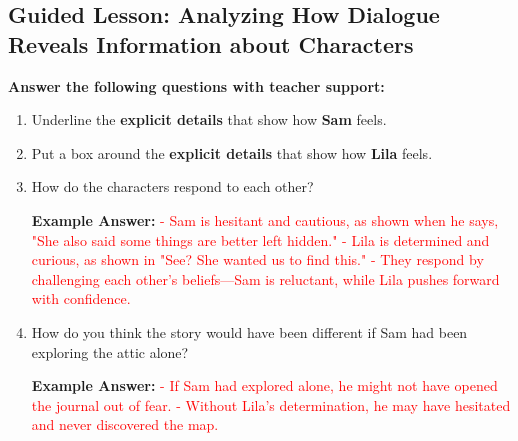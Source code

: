 \documentclass[12pt]{article}
\begin{document}
\subsection*{Guided Lesson: Analyzing How Dialogue Reveals Information about Characters}
\onehalfspacing

\begin{tcolorbox}[colframe=black!60, colback=white, 
coltitle=black, colbacktitle=black!15, fonttitle=\bfseries\Large, 
title=Guided Practice, halign title=center]
\textbf{Answer the following questions with teacher support:}
\begin{enumerate}
    \item Underline the \textbf{explicit details }that show how \textbf{Sam} feels.
    \item Put a box around the \textbf{explicit details} that show how \textbf{Lila} feels.
    \item How do the characters respond to each other?  
    \vspace{2em}

    \textbf{Example Answer:}  
    \textcolor{red}{
    - Sam is hesitant and cautious, as shown when he says, "She also said some things are better left hidden."  
    - Lila is determined and curious, as shown in "See? She wanted us to find this."  
    - They respond by challenging each other's beliefs—Sam is reluctant, while Lila pushes forward with confidence.}
    \vspace{2em}

    \item How do you think the story would have been different if Sam had been exploring the attic alone?  
    \vspace{2em}

    \textbf{Example Answer:}  
    \textcolor{red}{
    - If Sam had explored alone, he might not have opened the journal out of fear.  
    - Without Lila’s determination, he may have hesitated and never discovered the map.}
\end{enumerate}
\end{tcolorbox}

\vspace{1em}
\end{document}
